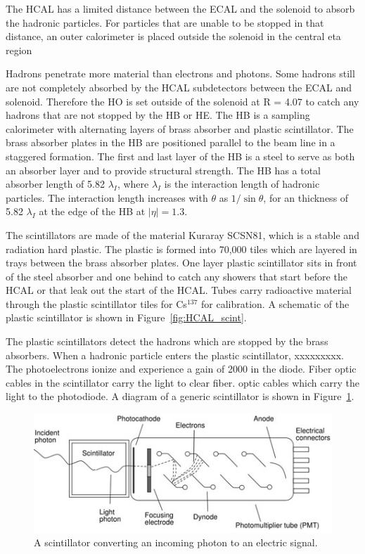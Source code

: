 The HCAL has a limited distance between the ECAL and the solenoid to absorb the hadronic particles. For particles that are unable to be stopped in that distance, an outer calorimeter is placed outside the solenoid in the central eta region



Hadrons penetrate more material than electrons and photons. Some hadrons still are not completely absorbed by the HCAL subdetectors between the ECAL and solenoid. Therefore the HO is set outside of the solenoid at R = 4.07 to catch any hadrons that are not stopped by the HB or HE. The HB is a sampling calorimeter with alternating layers of brass absorber and plastic scintillator. The brass absorber plates in the HB are positioned parallel to the beam line in a staggered formation. The first and last layer of the HB is a steel to serve as both an absorber layer and to provide structural strength. The HB has a total absorber length of 5.82 $\lambda_I$, where $\lambda_I$ is the interaction length of hadronic particles. The interaction length increases with $\theta$ as $1/\sin{\theta}$, for an thickness of 5.82 $\lambda_I$ at the edge of the HB at $|\eta| = 1.3$.

The scintillators are made of the material Kuraray SCSN81, which is a stable and radiation hard plastic. The plastic is formed into 70,000 tiles which are layered in trays between the brass absorber plates. One layer plastic scintillator sits in front of the steel absorber and one behind to catch any showers that start before the HCAL or that leak out the start of the HCAL. Tubes carry radioactive material through the plastic scintillator tiles for Cs$^{137}$ for calibration. A schematic of the plastic scintillator is shown in Figure~\ref{fig:HCAL_scint}.

The plastic scintillators detect the hadrons which are stopped by the brass absorbers. When a hadronic particle enters the plastic scintillator, xxxxxxxxx. The photoelectrons ionize and experience a gain of 2000 in the diode. Fiber optic cables in the scintillator carry the light to clear fiber. optic cables which carry the light to the photodiode. A diagram of a generic scintillator is shown in Figure~\ref{fig:scintillator}.

\begin{figure}[h]
\centering
\includegraphics[width=1.0\textwidth]{figures/scintillator.jpg}
\caption{A scintillator converting an incoming photon to an electric signal.}
\label{fig:scintillator}
\end{figure}

